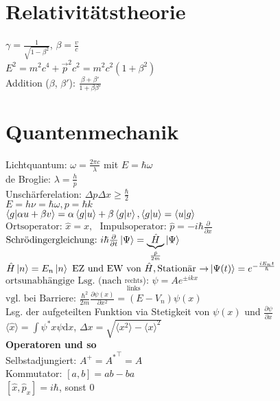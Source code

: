 \documentclass[a4paper, 11pt, fleqn]{article}
\renewcommand{\vec}{\overrightarrow}
\newcommand{\fpartial}[1]{\frac{\partial}{\partial #1}}
\newcommand{\ffpartial}[2]{\frac{\partial #1}{\partial #2}}
\begin{document}
\begin{multicols}{2}
\section{Relativitätstheorie}
$\gamma = \frac{1}{\sqrt{1 - \beta^2}}$, $\beta = \frac{v}{c}$\\
$E^2 = m^2 c^4 + \vec{p}^2 c^2 = m^2 c^2 (1 + \beta^2)$\\
Addition ($\beta$, $\beta'$): $\frac{\beta + \beta'}{1 + \beta \beta'}$

\section{Quantenmechanik}
Lichtquantum: $\omega = \frac{2 \pi c}{\lambda}$ mit $E = \hbar \omega$\\
de Broglie: $\lambda = \frac{h}{p}$\\
Unschärferelation: $\Delta p \Delta x \geq \frac{\hbar}{2}$\\
$E = h \nu = \hbar \omega, p = \hbar k$\\
$\braket{g | \alpha u + \beta v} = \alpha \braket{g | u} + \beta \braket{g | v}, \braket{g | u} = \braket{u | g}$\\
$\text{Ortsoperator:~} \hat{x} = x, \text{~~Impulsoperator:~} \hat{p} = -i \hbar \fpartial{x}$\\
$\text{Schrödingergleichung:~} i\hbar \fpartial{t} \ket{\Psi} = \underbrace{\hat{H}}_{\frac{\hat{p}}{2m}} \ket{\Psi}$\\
$\hat{H} \ket{n} = E_n \ket{n} \text{~EZ und EW von $\hat{H}$}, \text{Stationär $\rightarrow$} \ket{\Psi(t)} = e^{-\frac{i E_n t}{\hbar}}$\\
$\text{ortsunabhängige Lsg. (nach $\overset{\text{rechts}}{\underset{\text{links}}{~}}$):~} \psi = A e^{\pm i k x}$\\
$\text{vgl. bei Barriere:~} \frac{\hbar^2}{2m}\frac{\partial \psi(x)}{\partial x^2} = (E - V_n) \psi(x)$\\
Lsg. der aufgeteilten Funktion via Stetigkeit von $\psi(x)$ und $\ffpartial{\psi}{x}$\\
$\langle \hat{x} \rangle = \int \psi^\ast x \psi \mathrm{d} x$, $\Delta x = \sqrt{\langle x^2 \rangle - \langle x \rangle^2}$\\
\textbf{Operatoren und so}\\
Selbstadjungiert: $A^+ = {A^\ast}^\top = A$\\
Kommutator: $[a, b] = ab - ba$\\
$[\hat{x}, \hat{p}_x] = i \hbar$, sonst $0$\\

\end{multicols}
\end{document}
